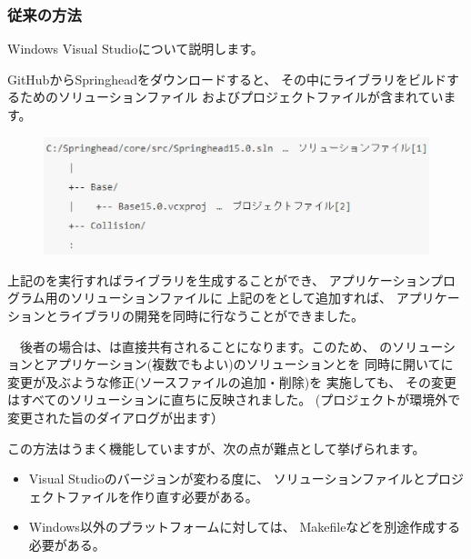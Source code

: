 \subsubsection{従来の方法}
\label{subsubsec:OldMethod}
\parindent=0pt

Windows Visual Studioについて説明します。

\medskip
GitHubからSpringheadをダウンロードすると、
その中にライブラリをビルドするためのソリューションファイル
およびプロジェクトファイルが含まれています。

\begin{narrow}[15pt]
	\begin{figure}[h]
	    \begin{center}
	    \includegraphics[width=.9\textwidth]{fig/DownloadTree.eps}
	    \end{center}
	    \label{fig:DownloadTree}
	\end{figure}
\end{narrow}

上記の\SolutionFile を実行すればライブラリを生成することができ、
アプリケーションプログラム用のソリューションファイルに
上記の\ProjectFile をとして追加すれば、
アプリケーションとライブラリの開発を同時に行なうことができました。

　後者の場合は、\ProjectFile は直接共有されることになります。このため、
\SprLib のソリューションとアプリケーション(複数でもよい)のソリューションとを
同時に開いて\ProjectFile に変更が及ぶような修正(ソースファイルの追加・削除)を
実施しても、
その変更はすべてのソリューションに直ちに反映されました。
(プロジェクトが環境外で変更された旨のダイアログが出ます）

\medskip
この方法はうまく機能していますが、次の点が難点として挙げられます。

\begin{itemize}
  \item	Visual Studioのバージョンが変わる度に、
	ソリューションファイルとプロジェクトファイルを作り直す必要がある。
  \item	Windows以外のプラットフォームに対しては、
	Makefileなどを別途作成する必要がある。
\end{itemize}


